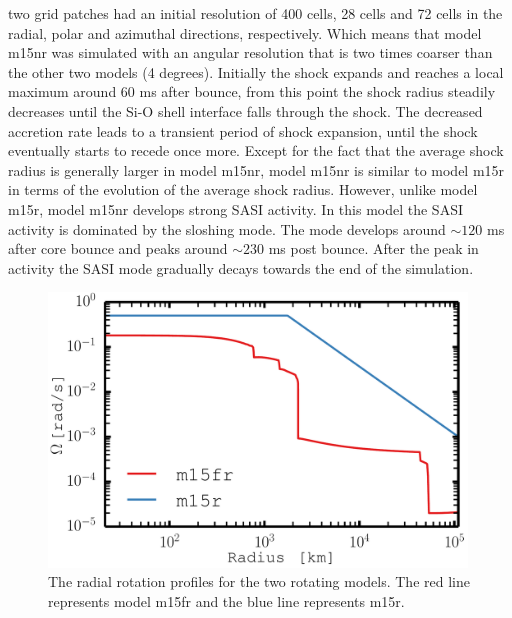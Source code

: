 \begin{itemize}
two grid patches had an initial resolution of 400 cells, 28 cells and 72 cells in the radial, polar and
azimuthal directions, respectively. Which means that model m15nr was simulated with an angular resolution that is
two times coarser than the other two models (4 degrees). Initially the shock expands and reaches a local maximum around $60$ ms after bounce,
from this point the shock radius steadily decreases until the Si-O shell interface falls through the shock. The decreased accretion rate
leads to a transient period of shock expansion, until the shock eventually starts to recede once more. Except for the fact that
the average shock radius is generally larger in model m15nr, model m15nr is similar to model m15r in terms of the evolution of the average shock
radius. However, unlike model m15r, model m15nr develops strong SASI activity. In this model the SASI activity is dominated by the sloshing mode.
The mode develops around $\sim 120$ ms after core bounce and peaks around $\sim 230$ ms post bounce. After the peak in activity 
the SASI mode gradually decays towards the end of the simulation.   
\end{itemize}
\begin{figure}[ht]           
\centering                            
\includegraphics[width=0.99\textwidth]{./images/paper2/rot.pdf}
\caption{The radial rotation profiles for the two rotating models. The red line represents model 
m15fr and the blue line represents m15r. \label{figp2:rot}}
\end{figure}
